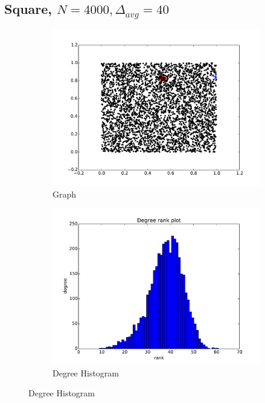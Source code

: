 \documentclass[oneside, titlepage]{scrartcl}
\begin{document}
\subsection{Square, $N=4000, \Delta_{avg}=40$}
\begin{figure}[!h]
\centering
\begin{subfigure}{0.5\textwidth}
	\centering
	\includegraphics[width=0.9\linewidth]{figures/graph2.pdf}
	\caption{Graph}
\end{subfigure}%
\begin{subfigure}{0.5\textwidth}
	\centering
	\includegraphics[width=0.9\linewidth]{figures/degrees2.pdf}
	\caption{Degree Histogram}
\end{subfigure}


\end{figure}
\end{document}
